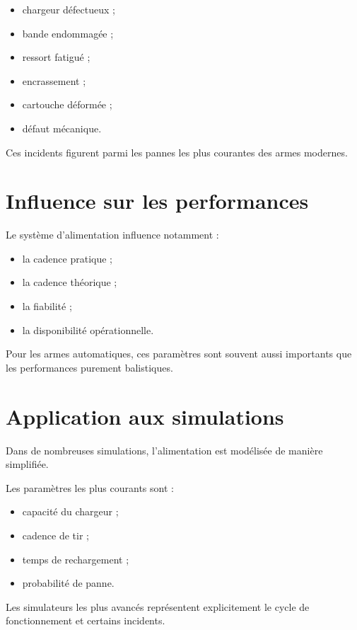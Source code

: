 \begin{itemize}
    \item chargeur défectueux ;
    \item bande endommagée ;
    \item ressort fatigué ;
    \item encrassement ;
    \item cartouche déformée ;
    \item défaut mécanique.
\end{itemize}

Ces incidents figurent parmi les pannes les plus courantes des armes
modernes.

\section{Influence sur les performances}

Le système d'alimentation influence notamment :

\begin{itemize}
    \item la cadence pratique ;
    \item la cadence théorique ;
    \item la fiabilité ;
    \item la disponibilité opérationnelle.
\end{itemize}

Pour les armes automatiques, ces paramètres sont souvent aussi importants
que les performances purement balistiques.

\section{Application aux simulations}

Dans de nombreuses simulations, l'alimentation est modélisée de manière
simplifiée.

Les paramètres les plus courants sont :

\begin{itemize}
    \item capacité du chargeur ;
    \item cadence de tir ;
    \item temps de rechargement ;
    \item probabilité de panne.
\end{itemize}

Les simulateurs les plus avancés représentent explicitement le cycle de
fonctionnement et certains incidents.

